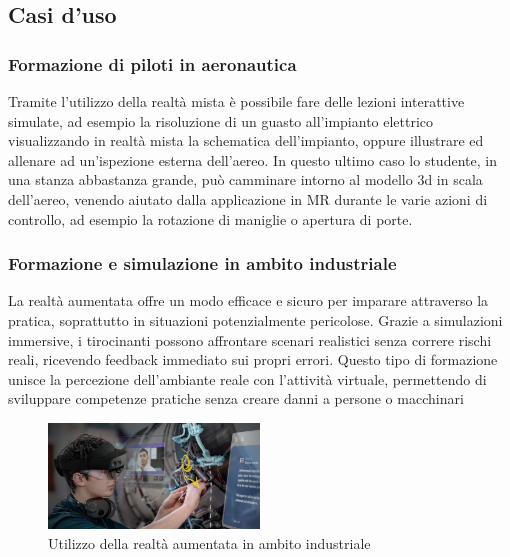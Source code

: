 \subsection{Casi d'uso}
\subsubsection{Formazione di piloti in aeronautica}
Tramite l'utilizzo della realtà mista è possibile fare delle lezioni interattive simulate, ad esempio la risoluzione di un guasto all'impianto elettrico visualizzando in realtà mista la schematica dell'impianto, oppure illustrare ed allenare ad un'ispezione esterna dell'aereo. In questo ultimo caso lo studente, in una stanza abbastanza grande, può camminare intorno al modello 3d in scala dell'aereo, venendo aiutato dalla applicazione in MR durante le varie azioni di controllo, ad esempio la rotazione di maniglie o apertura di porte.\cite{MixedRealityUseCasesforPilotTraining}

\subsubsection{Formazione e simulazione in ambito industriale}
La realtà aumentata offre un modo efficace e sicuro per imparare attraverso la pratica, soprattutto in situazioni potenzialmente pericolose. Grazie a simulazioni immersive, i tirocinanti possono affrontare scenari realistici senza correre rischi reali, ricevendo feedback immediato sui propri errori. Questo tipo di formazione unisce la percezione dell'ambiante reale con l'attività virtuale, permettendo di sviluppare competenze pratiche senza creare danni a persone o macchinari \cite{MicrosoftTrainingandSimulationforEnterprises}
\begin{figure}[H]
    \centering
    \includegraphics[width=0.5\textwidth,height=0.5\textheight,keepaspectratio]{figures/chapter_1/hololens_in_azienda.jpg}
    \caption{Utilizzo della realtà aumentata in ambito industriale}
\end{figure}

